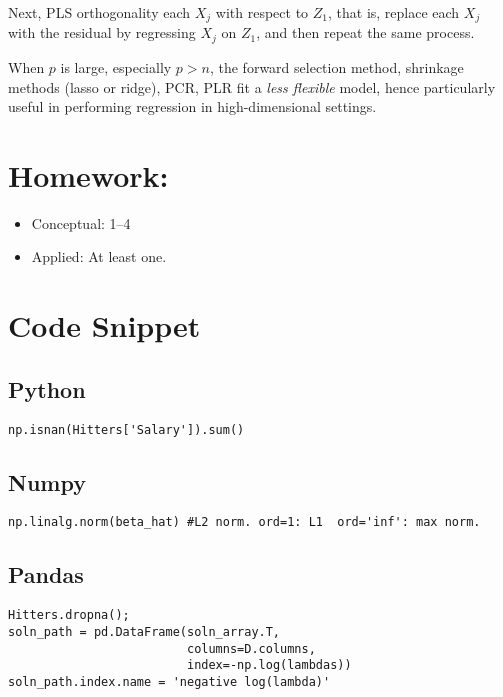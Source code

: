\documentclass[
  letterpaper,
  DIV=11,
  numbers=noendperiod]{scrreprt}
\providecommand{\tightlist}{%
  \setlength{\itemsep}{0pt}\setlength{\parskip}{0pt}}\usepackage{longtable,booktabs,array}
\begin{document}
Next, PLS orthogonality each \(X_j\) with respect to \(Z_1\), that is,
replace each \(X_j\) with the residual by regressing \(X_j\) on \(Z_1\),
and then repeat the same process.

When \(p\) is large, especially \(p>n\), the forward selection method,
shrinkage methods (lasso or ridge), PCR, PLR fit a \emph{less flexible}
model, hence particularly useful in performing regression in
high-dimensional settings.

\section{Homework:}\label{homework-2}

\begin{itemize}
\tightlist
\item
  Conceptual: 1--4
\item
  Applied: At least one.
\end{itemize}

\section{Code Snippet}\label{code-snippet}

\subsection{Python}\label{python-4}

\begin{verbatim}
np.isnan(Hitters['Salary']).sum()
\end{verbatim}

\subsection{Numpy}\label{numpy-4}

\begin{verbatim}
np.linalg.norm(beta_hat) #L2 norm. ord=1: L1  ord='inf': max norm.
\end{verbatim}

\subsection{Pandas}\label{pandas-4}

\begin{verbatim}
Hitters.dropna();
soln_path = pd.DataFrame(soln_array.T,
                         columns=D.columns,
                         index=-np.log(lambdas))
soln_path.index.name = 'negative log(lambda)'
\end{verbatim}
\end{document}
